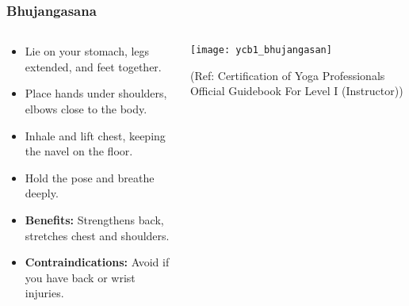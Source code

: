 \begin{frame}[fragile]\frametitle{Bhujangasana}
\begin{columns}
    \begin{column}[T]{0.5\linewidth}
      \begin{itemize}
        \item Lie on your stomach, legs extended, and feet together.
        \item Place hands under shoulders, elbows close to the body.
        \item Inhale and lift chest, keeping the navel on the floor.
        \item Hold the pose and breathe deeply.
        \item \textbf{Benefits:} Strengthens back, stretches chest and shoulders.
        \item \textbf{Contraindications:} Avoid if you have back or wrist injuries.
      \end{itemize}
    \end{column}
    \begin{column}[T]{0.5\linewidth}
        \begin{center}
        \begin{center}
		        \texttt{[image: ycb1\_bhujangasan]}
				
				{\tiny (Ref: Certification  of Yoga Professionals Official Guidebook For Level I (Instructor))}	        
		\end{center}   
        \end{center}    
    \end{column}
  \end{columns}
\end{frame}

